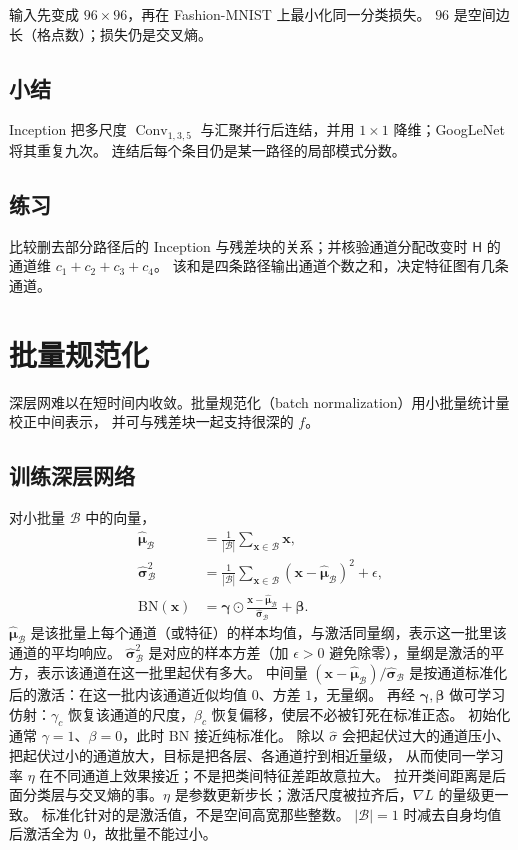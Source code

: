 输入先变成 $96\times 96$，再在 Fashion-MNIST 上最小化同一分类损失。
$96$ 是空间边长（格点数）；损失仍是交叉熵。

\subsection{小结}

Inception 把多尺度 $\operatorname{Conv}_{1,3,5}$ 与汇聚并行后连结，并用 $1\times 1$ 降维；GoogLeNet 将其重复九次。
连结后每个条目仍是某一路径的局部模式分数。

\subsection{练习}

比较删去部分路径后的 Inception 与残差块的关系；并核验通道分配改变时 $\mathsf{H}$ 的通道维
$c_1+c_2+c_3+c_4$。
该和是四条路径输出通道个数之和，决定特征图有几条通道。

\section{批量规范化}

深层网难以在短时间内收敛。批量规范化（batch normalization）用小批量统计量校正中间表示，
并可与残差块一起支持很深的 $f$。

\subsection{训练深层网络}

对小批量 $\mathcal{B}$ 中的向量，
\begin{align*}
\hat{\bm{\mu}}_{\mathcal{B}}
&=
\frac{1}{|\mathcal{B}|}\sum_{\bm{x}\in\mathcal{B}}\bm{x},\\
\hat{\bm{\sigma}}_{\mathcal{B}}^{2}
&=
\frac{1}{|\mathcal{B}|}\sum_{\bm{x}\in\mathcal{B}}
(\bm{x}-\hat{\bm{\mu}}_{\mathcal{B}})^{2}
+\epsilon,\\
\mathrm{BN}(\bm{x})
&=
\bm{\gamma}\odot
\frac{\bm{x}-\hat{\bm{\mu}}_{\mathcal{B}}}{\hat{\bm{\sigma}}_{\mathcal{B}}}
+
\bm{\beta}.
\end{align*}
$\hat{\bm{\mu}}_{\mathcal{B}}$ 是该批量上每个通道（或特征）的样本均值，与激活同量纲，表示这一批里该通道的平均响应。
$\hat{\bm{\sigma}}_{\mathcal{B}}^{2}$ 是对应的样本方差（加 $\epsilon>0$ 避免除零），量纲是激活的平方，表示该通道在这一批里起伏有多大。
中间量 $(\bm{x}-\hat{\bm{\mu}}_{\mathcal{B}})/\hat{\bm{\sigma}}_{\mathcal{B}}$ 是按通道标准化后的激活：在这一批内该通道近似均值 $0$、方差 $1$，无量纲。
再经 $\bm{\gamma},\bm{\beta}$ 做可学习仿射：$\gamma_c$ 恢复该通道的尺度，$\beta_c$ 恢复偏移，使层不必被钉死在标准正态。
初始化通常 $\gamma=1$、$\beta=0$，此时 BN 接近纯标准化。
除以 $\hat{\sigma}$ 会把起伏过大的通道压小、把起伏过小的通道放大，目标是把各层、各通道拧到相近量级，
从而使同一学习率 $\eta$ 在不同通道上效果接近；不是把类间特征差距故意拉大。
拉开类间距离是后面分类层与交叉熵的事。$\eta$ 是参数更新步长；激活尺度被拉齐后，$\nabla L$ 的量级更一致。
标准化针对的是激活值，不是空间高宽那些整数。
$|\mathcal{B}|=1$ 时减去自身均值后激活全为 $0$，故批量不能过小。


